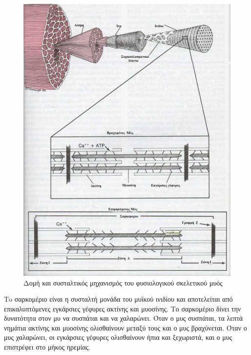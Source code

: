 \begin{figure}[H]
    \centering
    \includegraphics[width=.7\textwidth, height=0.5\textheight]{neuromusculoskeletal/fig/muscle-fysiology2.png}
    \caption{Δομή και συσταλτικός μηχανισμός του φυσιολογικού σκελετικού μυός\protect\footnotemark}
    \label{fig:muscle-fysiology2}
\end{figure}

Τo σαρκομέριο είναι η συσταλτή μονάδα του μυϊκού ινιδίου και αποτελείται από επικαλυπτόμενες εγκάρσιες γέφυρες ακτίνης και μυοσίνης. Το σαρκομέριο δίνει την δυνατότητα στον μυ να συσπάται και να χαλαρώνει. Όταν ο μυς συσπάται, τα λεπτά νημάτια ακτίνης και μυοσίνης ολισθαίνουν μεταξύ τους και ο μυς βραχύνεται. Όταν ο μυς χαλαρώνει, οι εγκάρσιες γέφυρες ολισθαίνουν ήπια και ξεχωριστά, και ο μυς επιστρέφει στο μήκος ηρεμίας.

